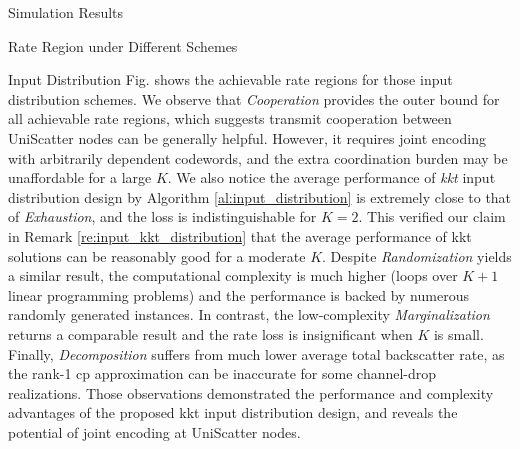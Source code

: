 \documentclass[journal]{IEEEtran}
\begin{document}
\begin{section}{Simulation Results}
\begin{subsection}{Rate Region under Different Schemes}
\begin{subsubsection}{Input Distribution}
			Fig.  shows the achievable rate regions for those input distribution schemes.
			We observe that \emph{Cooperation} provides the outer bound for all achievable rate regions, which suggests transmit cooperation between UniScatter nodes can be generally helpful.
			However, it requires joint encoding with arbitrarily dependent codewords, and the extra coordination burden may be unaffordable for a large $K$.
			We also notice the average performance of \emph{\gls{kkt}} input distribution design by Algorithm \ref{al:input_distribution} is extremely close to that of \emph{Exhaustion}, and the loss is indistinguishable for $K=2$.
			This verified our claim in Remark \ref{re:input_kkt_distribution} that the average performance of \gls{kkt} solutions can be reasonably good for a moderate $K$.
			Despite \emph{Randomization} yields a similar result, the computational complexity is much higher (loops over $K+1$ linear programming problems) and the performance is backed by numerous randomly generated instances.
			In contrast, the low-complexity \emph{Marginalization} returns a comparable result and the rate loss is insignificant when $K$ is small.
			Finally, \emph{Decomposition} suffers from much lower average total backscatter rate, as the rank-\num{1} \gls{cp} approximation can be inaccurate for some channel-drop realizations.
			Those observations demonstrated the performance and complexity advantages of the proposed \gls{kkt} input distribution design, and reveals the potential of joint encoding at UniScatter nodes.
		\end{subsubsection}



\end{subsection}
\end{section}
\end{document}
